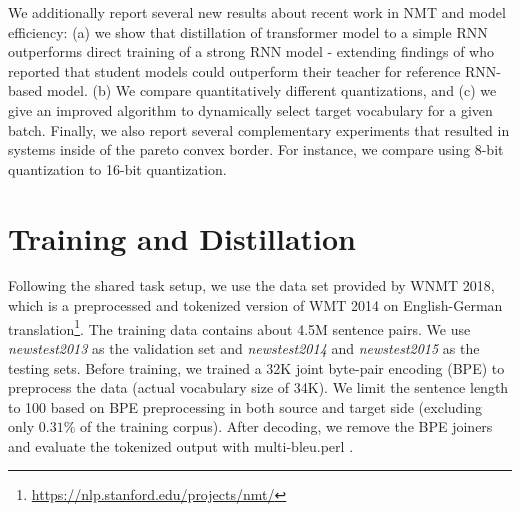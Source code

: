 \documentclass[11pt,a4paper]{article}
\begin{document}
We additionally report several new results about recent work in NMT
and model efficiency: (a) we show that distillation of transformer
model to a simple RNN outperforms direct training of a strong RNN model - extending
findings of  who reported that
student models could outperform their teacher for reference RNN-based
model. (b) We compare
quantitatively different quantizations, and (c) we give an improved
algorithm to dynamically select  target vocabulary for a given batch.
Finally, we also report several complementary experiments that
resulted in  systems inside of the pareto convex border. For instance, we
compare using 8-bit quantization to 16-bit quantization.

%

\section{Training and Distillation}


Following the shared task setup, we use the data set provided by WNMT
2018, which is a preprocessed and tokenized version of WMT 2014 on
English-German
translation\footnote{\url{https://nlp.stanford.edu/projects/nmt/}}. The
training data contains about 4.5M sentence pairs. We use {\it news\-test2013}
as the validation set and {\it newstest2014} and {\it newstest2015} as the testing
sets. Before training, we trained a 32K joint byte-pair encoding (BPE)
to preprocess the data \cite{sennrich2015neural} (actual vocabulary size of 34K). We limit the sentence
length to 100 based on BPE preprocessing in both source and target
side (excluding only $0.31\%$ of the training corpus). After decoding,
we remove the BPE joiners and evaluate the tokenized output with
multi-bleu.perl \cite{koehn2007moses}.
\end{document}
